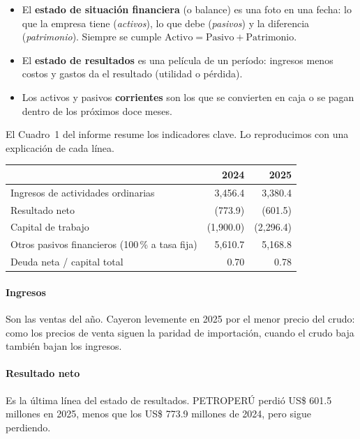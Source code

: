 \begin{definicion}
\begin{itemize}
\item El \textbf{estado de situación financiera} (o balance) es una foto en una fecha: lo que la empresa tiene (\emph{activos}), lo que debe (\emph{pasivos}) y la diferencia (\emph{patrimonio}). Siempre se cumple $\text{Activo}=\text{Pasivo}+\text{Patrimonio}$.
\item El \textbf{estado de resultados} es una película de un período: ingresos menos costos y gastos da el resultado (utilidad o pérdida).
\item Los activos y pasivos \textbf{corrientes} son los que se convierten en caja o se pagan dentro de los próximos doce meses.
\end{itemize}
\end{definicion}

El Cuadro~1 del informe resume los indicadores clave. Lo reproducimos con una explicación de cada línea.

\begin{center}\small
{}\label{tab:c1}
\begin{tabularx}{\linewidth}{@{}>{\raggedright\arraybackslash}Xrr@{}}
\toprule
& 2024 & 2025 \\
\midrule
Ingresos de actividades ordinarias & 3,456.4 & 3,380.4\\
Resultado neto & (773.9) & (601.5)\\
Capital de trabajo & (1,900.0) & (2,296.4)\\
Otros pasivos financieros (100\,\% a tasa fija) & 5,610.7 & 5,168.8\\
Deuda neta / capital total & 0.70 & 0.78\\
\bottomrule
\end{tabularx}
\end{center}

\paragraph{Ingresos} Son las ventas del año. Cayeron levemente en 2025 por el menor precio del crudo: como los precios de venta siguen la paridad de importación, cuando el crudo baja también bajan los ingresos.

\paragraph{Resultado neto} Es la última línea del estado de resultados. PETROPERÚ perdió US\$ 601.5 millones en 2025, menos que los US\$ 773.9 millones de 2024, pero sigue perdiendo.

